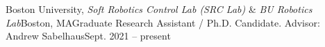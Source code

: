 \begin{rSubsection}{Boston University, \textit{Soft Robotics Control Lab (SRC Lab)} \& \textit{BU Robotics Lab}}{Boston, MA}{Graduate Research Assistant / Ph.D. Candidate. Advisor: Andrew Sabelhaus}{Sept. 2021 -- present}
\end{rSubsection} 
\vspace{0.1cm}
